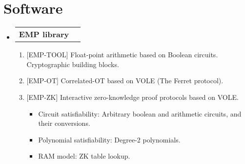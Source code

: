 \documentclass[letterpaper,11pt]{article}
\makeatletter
\newcommand{\resumeItem}[1]{
  \item\small{
    {#1 \vspace{-2pt}}
  }
}
\newcommand{\resumeDevHeading}[1]{
    \item
    \begin{tabular*}{0.97\textwidth}{l@{\extracolsep{\fill}}r}
        \textbf{#1} \\
    \end{tabular*}\vspace{-7pt}
}
\newcommand{\resumeItemListStart}{\begin{itemize}}
\newcommand{\resumeItemListEnd}{\end{itemize}\vspace{-5pt}}
\makeatother
\begin{document}
\section{Software}
 \begin{itemize}[leftmargin=0.15in, label={}]
    \resumeDevHeading
      {\small EMP library}
		 \begin{enumerate}
             \item \small {[EMP-TOOL] Float-point arithmetic based on Boolean circuits. Cryptographic building blocks.}
			 \item \small {[EMP-OT] Correlated-OT based on VOLE (The Ferret protocol).}
			 \item \small {[EMP-ZK] Interactive zero-knowledge proof protocols based on VOLE.
         \begin{itemize}
          \item Circuit satisfiability: Arbitrary boolean and arithmetic circuits, and their conversions.
          \item Polynomial satisfiability: Degree-2 polynomials.
          \item RAM model: ZK table lookup.
         \end{itemize} }
		 \end{enumerate}
 \end{itemize}


\end{document}
